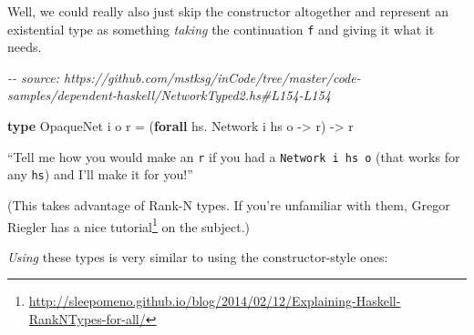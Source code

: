 \documentclass[]{article}
\newenvironment{Shaded}{}{}
\newcommand{\CommentTok}[1]{\textcolor[rgb]{0.38,0.63,0.69}{\textit{#1}}}
\newcommand{\DataTypeTok}[1]{\textcolor[rgb]{0.56,0.13,0.00}{#1}}
\newcommand{\KeywordTok}[1]{\textcolor[rgb]{0.00,0.44,0.13}{\textbf{#1}}}
\newcommand{\NormalTok}[1]{#1}
\newcommand{\OperatorTok}[1]{\textcolor[rgb]{0.40,0.40,0.40}{#1}}
\newcommand{\OtherTok}[1]{\textcolor[rgb]{0.00,0.44,0.13}{#1}}
\renewcommand{\href}[2]{#2\footnote{\url{#1}}}
\begin{document}
Well, we could really also just skip the constructor altogether and represent an
existential type as something \emph{taking} the continuation \texttt{f} and
giving it what it needs.

\begin{Shaded}
\begin{Highlighting}[]
\CommentTok{{-}{-} source: https://github.com/mstksg/inCode/tree/master/code{-}samples/dependent{-}haskell/NetworkTyped2.hs\#L154{-}L154}

\KeywordTok{type} \DataTypeTok{OpaqueNet\textquotesingle{}}\NormalTok{ i o r }\OtherTok{=}\NormalTok{ (}\KeywordTok{forall}\NormalTok{ hs}\OperatorTok{.} \DataTypeTok{Network}\NormalTok{ i hs o }\OtherTok{{-}\textgreater{}}\NormalTok{ r) }\OtherTok{{-}\textgreater{}}\NormalTok{ r}
\end{Highlighting}
\end{Shaded}

``Tell me how you would make an \texttt{r} if you had a
\texttt{Network\ i\ hs\ o} (that works for any \texttt{hs}) and I'll make it for
you!''

(This takes advantage of Rank-N types. If you're unfamiliar with them, Gregor
Riegler has a
\href{http://sleepomeno.github.io/blog/2014/02/12/Explaining-Haskell-RankNTypes-for-all/}{nice
tutorial} on the subject.)

\emph{Using} these types is very similar to using the constructor-style ones:
\end{document}
